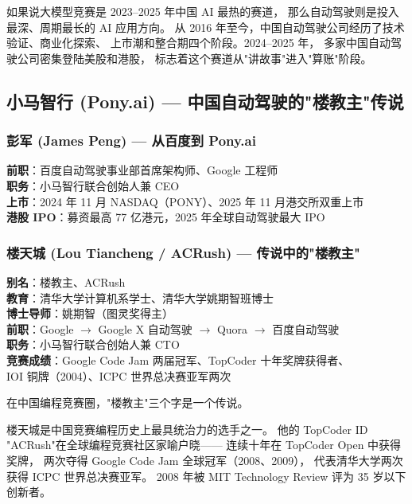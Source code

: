 如果说大模型竞赛是 2023--2025 年中国 AI 最热的赛道，
那么自动驾驶则是投入最深、周期最长的 AI 应用方向。
从 2016 年至今，中国自动驾驶公司经历了技术验证、商业化探索、
上市潮和整合期四个阶段。2024--2025 年，
多家中国自动驾驶公司密集登陆美股和港股，
标志着这个赛道从"讲故事"进入"算账"阶段。


\subsection{小马智行 (Pony.ai) — 中国自动驾驶的"楼教主"传说}

\subsubsection{彭军 (James Peng) — 从百度到 Pony.ai}

\begin{keybox}[人物档案：彭军]
\textbf{前职}：百度自动驾驶事业部首席架构师、Google 工程师 \\
\textbf{职务}：小马智行联合创始人兼 CEO \\
\textbf{上市}：2024 年 11 月 NASDAQ（PONY）、2025 年 11 月港交所双重上市 \\
\textbf{港股 IPO}：募资最高 77 亿港元，2025 年全球自动驾驶最大 IPO
\end{keybox}

\subsubsection{楼天城 (Lou Tiancheng / ACRush) — 传说中的"楼教主"}

\begin{keybox}
\textbf{别名}：楼教主、ACRush \\
\textbf{教育}：清华大学计算机系学士、清华大学姚期智班博士 \\
\textbf{博士导师}：姚期智（图灵奖得主）\\
\textbf{前职}：Google $\to$ Google X 自动驾驶 $\to$ Quora $\to$ 百度自动驾驶 \\
\textbf{职务}：小马智行联合创始人兼 CTO \\
\textbf{竞赛成绩}：Google Code Jam 两届冠军、TopCoder 十年奖牌获得者、\\
\quad IOI 铜牌（2004）、ICPC 世界总决赛亚军两次
\end{keybox}

在中国编程竞赛圈，"楼教主"三个字是一个传说。

楼天城是中国竞赛编程历史上最具统治力的选手之一。
他的 TopCoder ID "ACRush"在全球编程竞赛社区家喻户晓——
连续十年在 TopCoder Open 中获得奖牌，
两次夺得 Google Code Jam 全球冠军（2008、2009），
代表清华大学两次获得 ICPC 世界总决赛亚军。
2008 年被 MIT Technology Review 评为 35 岁以下创新者。

